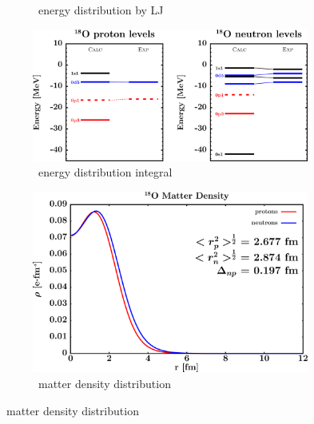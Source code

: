 \begin{figure}[hbtp]
\begin{subfigure}{0.45\textwidth}
        \caption{\oEight\ energy distribution by LJ}
        \label{DOMFitData_o18_proton_energyDistInt}
    \end{subfigure}\hspace{6pt}
    \begin{subfigure}{0.45\textwidth}
        \centering
        \includegraphics[width=\linewidth]{figures/o18_EnergyDistIntegral.png}
        \caption{\oEight\ energy distribution integral}
        \label{DOMFitData_o18_neutron_energyDistInt}
    \end{subfigure}\vspace{0.4in}
    \begin{subfigure}{0.70\textwidth}
        \centering
        \includegraphics[width=\linewidth]{figures/o18_matterDensity.png}
        \caption{\oEight\ matter density distribution}
        \label{DOMFitData_o18_matterDensity}
    \end{subfigure}
\end{figure}

